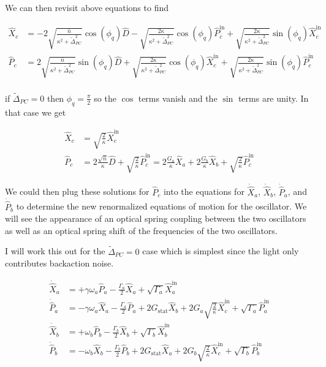 \documentclass[12pt]{article}
\begin{document}
We can then revisit above equations to find

\begin{align}
\hat{X}_c &= -2\sqrt{\frac{\bar{n}}{\kappa^2 + \tilde{\Delta}_{PC}^2}}\cos(\phi_q) \hat{D} - \sqrt{\frac{2\kappa}{\kappa^2 + \tilde{\Delta}_{PC}^2}}\cos(\phi_q) \hat{P}_c^{\text{in}} + \sqrt{\frac{2\kappa}{\kappa^2 + \tilde{\Delta}_{PC}^2}}\sin(\phi_q)\hat{X}_c^{\text{in}}\\
\hat{P}_c &= 2\sqrt{\frac{\bar{n}}{\kappa^2 + \tilde{\Delta}_{PC}^2}}\sin(\phi_q) \hat{D} + \sqrt{\frac{2\kappa}{\kappa^2 + \tilde{\Delta}_{PC}^2}}\cos(\phi_q) \hat{X}_c^{\text{in}} + \sqrt{\frac{2\kappa}{\kappa^2 + \tilde{\Delta}_{PC}^2}}\sin(\phi_q)\hat{P}_c^{\text{in}}\\
\end{align}

if $\tilde{\Delta}_{PC} = 0$ then $\phi_q = \frac{\pi}{2}$ so the $\cos$ terms vanish and the $\sin$ terms are unity. In that case we get

\begin{align}
\hat{X}_c &= \sqrt{\frac{2}{\kappa}} \hat{X}_c^{\text{in}}\\
\hat{P}_c &= 2 \frac{\sqrt{\bar{n}}}{\kappa} \hat{D} + \sqrt{\frac{2}{\kappa}}\hat{P}_c^{\text{in}} = 2 \frac{G_a}{\kappa} \hat{X}_a + 2 \frac{G_b}{\kappa} \hat{X}_b + \sqrt{\frac{2}{\kappa}}\hat{P}_c^{\text{in}}
\end{align}

We could then plug these solutions for $\hat{P}_c$ into the equations for $\dot{\hat{X}}_a$, $\dot{\hat{X}}_b$, $\dot{\hat{P}}_a$, and $\dot{\hat{P}}_b$ to determine the new renormalized equations of motion for the oscillator. We will see the appearance of an optical spring coupling between the two oscillators as well as an optical spring shift of the frequencies of the two oscillators.

I will work this out for the $\tilde{\Delta}_{PC} = 0$ case which is simplest since the light only contributes backaction noise.

\begin{align}
\dot{\hat{X}}_a &= + \gamma \omega_a \hat{P}_a - \frac{\Gamma_a}{2} \hat{X}_a + \sqrt{\Gamma_a} \hat{X}_a^{\text{in}}\\
\dot{\hat{P}}_a &= - \gamma \omega_a \hat{X}_a - \frac{\Gamma_a}{2} \hat{P}_a + 2 G_{\text{stat}} \hat{X}_b + 2 G_a \sqrt{\frac{2}{\kappa}} \hat{X}_c^{\text{in}} + \sqrt{\Gamma_a} \hat{P}_a^{\text{in}}\\
\dot{\hat{X}}_b &= +\omega_b \hat{P}_b - \frac{\Gamma_b}{2} \hat{X}_b + \sqrt{\Gamma_b} \hat{X}_b^{\text{in}}\\
\dot{\hat{P}}_b &= -\omega_b \hat{X}_b - \frac{\Gamma_b}{2} \hat{P}_b + 2 G_{\text{stat}} \hat{X}_a + 2 G_b \sqrt{\frac{2}{\kappa}} \hat{X}_c^{\text{in}} + \sqrt{\Gamma_b} \hat{P}_b^{\text{in}}\\
\end{align}
\end{document}
